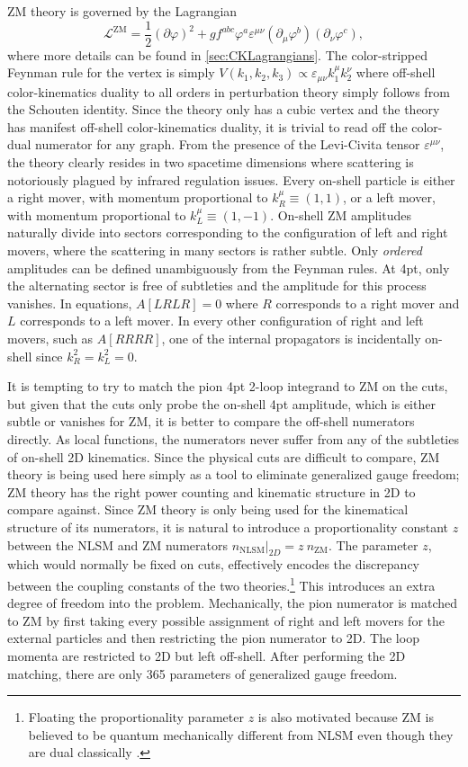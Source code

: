 \documentclass[11pt,letter]{article}
\def\be{\begin{equation}}
\def\ee{\end{equation}}
\begin{document}
ZM theory is governed by the Lagrangian
\be
\label{eq:ZMLagrangian}
\mathcal{L}^{\text{ZM}} = \frac{1}{2}(\partial \varphi)^2 + g f^{abc} \varphi^a \varepsilon^{\mu\nu}(\partial_\mu \varphi^b)( \partial_\nu \varphi^c),
\ee
where more details can be found in \cref{sec:CKLagrangians}.
The color-stripped Feynman rule for the vertex is simply $V(k_1, k_2, k_3) \propto \varepsilon_{\mu\nu}k_1^\mu k_2^\nu$ where off-shell color-kinematics duality to all orders in perturbation theory simply follows from the Schouten identity.
Since the theory only has a cubic vertex and the theory has manifest off-shell color-kinematics duality, it is trivial to read off the color-dual numerator for any graph.
From the presence of the Levi-Civita tensor $\varepsilon^{\mu\nu}$, the theory clearly resides in two spacetime dimensions where scattering is notoriously plagued by infrared regulation issues.
Every on-shell particle is either a right mover, with momentum proportional to $k_R^\mu \equiv (1,1)$, or a left mover, with momentum proportional to $k_L^\mu \equiv (1,-1)$.
On-shell ZM amplitudes naturally divide into sectors corresponding to the configuration of left and right movers, where the scattering in many sectors is rather subtle.
Only \emph{ordered} amplitudes can be defined unambiguously from the Feynman rules.
At 4pt, only the alternating sector is free of subtleties and the amplitude for this process vanishes.
In equations, $A[LRLR]=0$ where $R$ corresponds to a right mover and $L$ corresponds to a left mover.
In every other configuration of right and left movers, such as $A[RRRR]$, one of the internal propagators is incidentally on-shell since $k_R^2=k_L^2=0$.

It is tempting to try to match the pion 4pt 2-loop integrand to ZM on the cuts, but given that the cuts only probe the on-shell 4pt amplitude, which is either subtle or vanishes for ZM, it is better to compare the off-shell numerators directly.
As local functions, the numerators never suffer from any of the subtleties of on-shell 2D kinematics.
Since the physical cuts are difficult to compare, ZM theory is being used here simply as a tool to eliminate generalized gauge freedom; ZM theory has the right power counting and kinematic structure in 2D to compare against.
Since ZM theory is only being used for the kinematical structure of its numerators, it is natural to introduce a proportionality constant $z$ between the NLSM and ZM numerators $n_\text{NLSM} \vert_{2D} = z ~ n_\text{ZM}$.
The parameter $z$, which would normally be fixed on cuts, effectively encodes the discrepancy between the coupling constants of the two theories.\footnote{Floating the proportionality parameter $z$ is also motivated because ZM is believed to be quantum mechanically different from NLSM even though they are dual classically \cite{Nappi:1979ig}.}
This introduces an extra degree of freedom into the problem.
Mechanically, the pion numerator is matched to ZM by first taking every possible assignment of right and left movers for the external particles and then restricting the pion numerator to 2D.
The loop momenta are restricted to 2D but left off-shell.
After performing the 2D matching, there are only 365 parameters of generalized gauge freedom.
\end{document}
